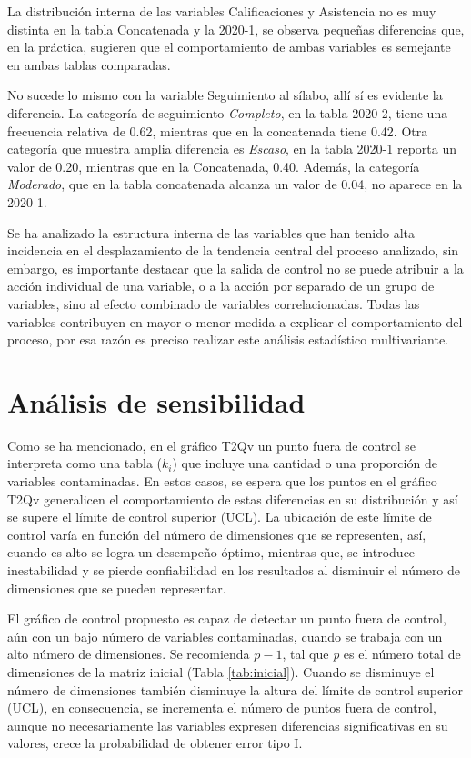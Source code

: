 \documentclass[mathematics,article,submit,moreauthors,pdftex]{mdpi}
\begin{document}
La distribución interna de las variables Calificaciones y Asistencia no
es muy distinta en la tabla Concatenada y la 2020-1, se observa pequeñas
diferencias que, en la práctica, sugieren que el comportamiento de ambas
variables es semejante en ambas tablas comparadas.

No sucede lo mismo con la variable Seguimiento al sílabo, allí sí es
evidente la diferencia. La categoría de seguimiento \emph{Completo}, en
la tabla 2020-2, tiene una frecuencia relativa de 0.62, mientras que en
la concatenada tiene 0.42. Otra categoría que muestra amplia diferencia
es \emph{Escaso}, en la tabla 2020-1 reporta un valor de 0.20, mientras
que en la Concatenada, 0.40. Además, la categoría \emph{Moderado}, que
en la tabla concatenada alcanza un valor de 0.04, no aparece en la
2020-1.

Se ha analizado la estructura interna de las variables que han tenido
alta incidencia en el desplazamiento de la tendencia central del proceso
analizado, sin embargo, es importante destacar que la salida de control
no se puede atribuir a la acción individual de una variable, o a la
acción por separado de un grupo de variables, sino al efecto combinado
de variables correlacionadas. Todas las variables contribuyen en mayor o
menor medida a explicar el comportamiento del proceso, por esa razón es
preciso realizar este análisis estadístico multivariante.

\hypertarget{anuxe1lisis-de-sensibilidad}{%
\section{Análisis de sensibilidad}\label{anuxe1lisis-de-sensibilidad}}

Como se ha mencionado, en el gráfico T2Qv un punto fuera de control se
interpreta como una tabla (\(k_i\)) que incluye una cantidad o una
proporción de variables contaminadas. En estos casos, se espera que los
puntos en el gráfico T2Qv generalicen el comportamiento de estas
diferencias en su distribución y así se supere el límite de control
superior (UCL). La ubicación de este límite de control varía en función
del número de dimensiones que se representen, así, cuando es alto se
logra un desempeño óptimo, mientras que, se introduce inestabilidad y se
pierde confiabilidad en los resultados al disminuir el número de
dimensiones que se pueden representar.

El gráfico de control propuesto es capaz de detectar un punto fuera de
control, aún con un bajo número de variables contaminadas, cuando se
trabaja con un alto número de dimensiones. Se recomienda \(p - 1\), tal
que \emph{p} es el número total de dimensiones de la matriz inicial
(Tabla \ref{tab:inicial}). Cuando se disminuye el número de dimensiones
también disminuye la altura del límite de control superior (UCL), en
consecuencia, se incrementa el número de puntos fuera de control, aunque
no necesariamente las variables expresen diferencias significativas en
su valores, crece la probabilidad de obtener error tipo I.
\end{document}

